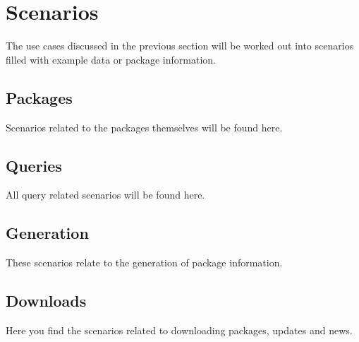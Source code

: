 \newpage
\section{Scenarios}  
The use cases discussed in the previous section will be worked out into scenarios filled with example data or package information.


\subsection{Packages}
Scenarios related to the packages themselves will be found here.










\subsection{Queries}
All query related scenarios will be found here.















\subsection{Generation}
These scenarios relate to the generation of package information.





\subsection{Downloads}
Here you find the scenarios related to downloading packages, updates and news.

